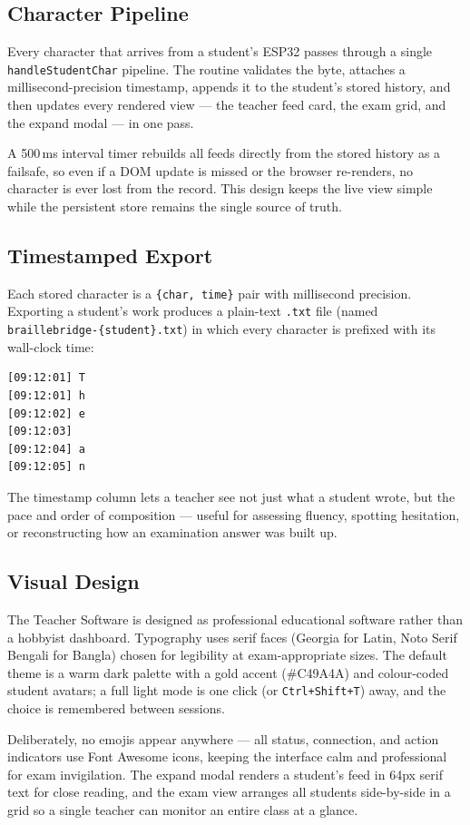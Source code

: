 \documentclass[11pt,a4paper,twoside]{article}
\begin{document}
\subsection{Character Pipeline}
Every character that arrives from a student's ESP32 passes through a
single \texttt{handleStudentChar} pipeline. The routine validates the
byte, attaches a millisecond-precision timestamp, appends it to the
student's stored history, and then updates every rendered view --- the
teacher feed card, the exam grid, and the expand modal --- in one pass.

A 500\,ms interval timer rebuilds all feeds directly from the stored
history as a failsafe, so even if a DOM update is missed or the browser
re-renders, no character is ever lost from the record. This design keeps
the live view simple while the persistent store remains the single
source of truth.

\subsection{Timestamped Export}
Each stored character is a \texttt{\{char, time\}} pair with
millisecond precision. Exporting a student's work produces a plain-text
\texttt{.txt} file (named \texttt{braillebridge-\{student\}.txt}) in which
every character is prefixed with its wall-clock time:

\begin{verbatim}
[09:12:01] T
[09:12:01] h
[09:12:02] e
[09:12:03]   
[09:12:04] a
[09:12:05] n
\end{verbatim}

The timestamp column lets a teacher see not just what a student wrote,
but the pace and order of composition --- useful for assessing
fluency, spotting hesitation, or reconstructing how an examination
answer was built up.

\subsection{Visual Design}
The Teacher Software is designed as professional educational software
rather than a hobbyist dashboard. Typography uses serif faces (Georgia
for Latin, Noto Serif Bengali for Bangla) chosen for legibility at
exam-appropriate sizes. The default theme is a warm dark palette with a
gold accent (\#C49A4A) and colour-coded student avatars; a full light
mode is one click (or \texttt{Ctrl+Shift+T}) away, and the choice is
remembered between sessions.

Deliberately, no emojis appear anywhere --- all status, connection, and
action indicators use Font Awesome icons, keeping the interface calm and
professional for exam invigilation. The expand modal renders a student's
feed in 64px serif text for close reading, and the exam view arranges
all students side-by-side in a grid so a single teacher can monitor an
entire class at a glance.
\end{document}
